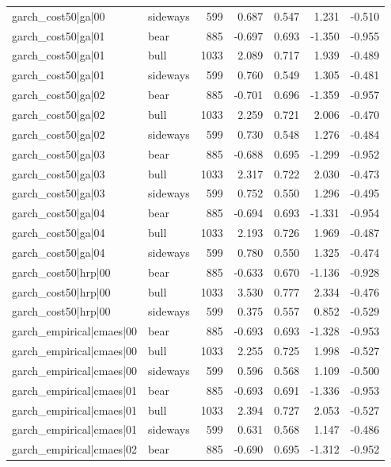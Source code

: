 \begin{table}
\begin{tabular}{llrrrrr}
garch\_cost50|ga|00 & sideways & 599 & 0.687 & 0.547 & 1.231 & -0.510 \\
garch\_cost50|ga|01 & bear & 885 & -0.697 & 0.693 & -1.350 & -0.955 \\
garch\_cost50|ga|01 & bull & 1033 & 2.089 & 0.717 & 1.939 & -0.489 \\
garch\_cost50|ga|01 & sideways & 599 & 0.760 & 0.549 & 1.305 & -0.481 \\
garch\_cost50|ga|02 & bear & 885 & -0.701 & 0.696 & -1.359 & -0.957 \\
garch\_cost50|ga|02 & bull & 1033 & 2.259 & 0.721 & 2.006 & -0.470 \\
garch\_cost50|ga|02 & sideways & 599 & 0.730 & 0.548 & 1.276 & -0.484 \\
garch\_cost50|ga|03 & bear & 885 & -0.688 & 0.695 & -1.299 & -0.952 \\
garch\_cost50|ga|03 & bull & 1033 & 2.317 & 0.722 & 2.030 & -0.473 \\
garch\_cost50|ga|03 & sideways & 599 & 0.752 & 0.550 & 1.296 & -0.495 \\
garch\_cost50|ga|04 & bear & 885 & -0.694 & 0.693 & -1.331 & -0.954 \\
garch\_cost50|ga|04 & bull & 1033 & 2.193 & 0.726 & 1.969 & -0.487 \\
garch\_cost50|ga|04 & sideways & 599 & 0.780 & 0.550 & 1.325 & -0.474 \\
garch\_cost50|hrp|00 & bear & 885 & -0.633 & 0.670 & -1.136 & -0.928 \\
garch\_cost50|hrp|00 & bull & 1033 & 3.530 & 0.777 & 2.334 & -0.476 \\
garch\_cost50|hrp|00 & sideways & 599 & 0.375 & 0.557 & 0.852 & -0.529 \\
garch\_empirical|cmaes|00 & bear & 885 & -0.693 & 0.693 & -1.328 & -0.953 \\
garch\_empirical|cmaes|00 & bull & 1033 & 2.255 & 0.725 & 1.998 & -0.527 \\
garch\_empirical|cmaes|00 & sideways & 599 & 0.596 & 0.568 & 1.109 & -0.500 \\
garch\_empirical|cmaes|01 & bear & 885 & -0.693 & 0.691 & -1.336 & -0.953 \\
garch\_empirical|cmaes|01 & bull & 1033 & 2.394 & 0.727 & 2.053 & -0.527 \\
garch\_empirical|cmaes|01 & sideways & 599 & 0.631 & 0.568 & 1.147 & -0.486 \\
garch\_empirical|cmaes|02 & bear & 885 & -0.690 & 0.695 & -1.312 & -0.952 \\

\end{tabular}
\end{table}
